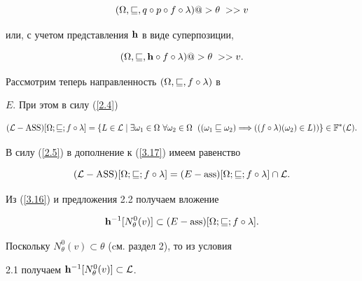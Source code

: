 {\begin{pf}
$$


(\Om,\sqsubseteq,q\circ{p}\circ{f}\circ\ld) @>{\theta\;}>> v


$$


или, с учетом представления ${\bold h}$ в виде суперпозиции,


\begin{equation}\label{3.16}


(\Om,\sqsubseteq,{\bold h}\circ{f}\circ\ld) @>{\theta\;}>> v.


\end{equation}


Рассмотрим теперь направленность $(\Omega,\sqsubseteq,f\circ\lambda)$ в


$E$. При этом в силу (\ref{2.4})


\begin{equation}\label{3.17}


({\cal L}-\ASS)[\Om;\sqsubseteq;f\circ\ld] = \{L \in


{\cal L} \mid \exi{{\omega}_1} \in \Om\ \fo{{\omega}_2} \in


\Om\ \; (({{\omega}_1}\sqsubseteq{{\omega}_2}) \Lo


((f\circ\ld)({\omega}_2) \in L))\} \in


{{\Bbb F}^*}({\cal L}).


\end{equation} 


В силу (\ref{2.5}) в дополнение к (\ref{3.17}) имеем равенство


\begin{equation}\label{3.18}


({\cal L}-\ASS)[\Omega;\sqsubseteq;f\circ\ld] =


(E-\ass)[\Om;\sqsubseteq;f\circ\ld]\cap{\cal L}.


\end{equation}


Из (\ref{3.16}) и предложения 2.2 получаем вложение


\begin{equation}


\label{3.19}


{{\bold h}^{-1}}[{N_\theta^0}(v)] \subset


(E-\ass)[\Om;\sqsubseteq;f\circ\ld].


\end{equation}


Поскольку ${N_\theta^0}(v) \subset \theta$ (cм. раздел 2), то из условия


2.1 получаем ${{\bold h}^{-1}}[{N_\theta^0}(v)] \subset {\cal L}$.



\end{pf}}
